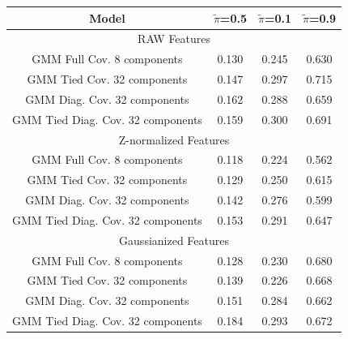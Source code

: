 \documentclass[12pt,a4paper]{article}
\begin{document}
\begin{center}
    \renewcommand{\arraystretch}{1.2}
    \begin{tabular}{@{}cccc@{}}
        Model                                        & \(\tilde{\pi}\)=0.5  & \(\tilde{\pi}\)=0.1   & \(\tilde{\pi}\)=0.9  \\ [0.5ex]

        \hline
        \multicolumn{4}{c}{RAW Features}                                                                                   \\
        \hline
        GMM Full Cov. 8 components                   & 0.130                & 0.245                 & 0.630                \\
        GMM Tied Cov. 32 components                  & 0.147                & 0.297                 & 0.715                \\
        GMM Diag. Cov. 32 components                 & 0.162                & 0.288                 & 0.659                \\
        GMM Tied Diag. Cov. 32 components            & 0.159                & 0.300                 & 0.691                \\

        \hline
        \multicolumn{4}{c}{Z-normalized Features}                                                                          \\
        \hline
        GMM Full Cov. 8 components                   & {\color{red} 0.118 } & {\color{red} 0.224 }  & {\color{red} 0.562 } \\
        GMM Tied Cov. 32 components                  & 0.129                & 0.250                 & 0.615                \\
        GMM Diag. Cov. 32 components                 & 0.142                & 0.276                 & 0.599                \\
        GMM Tied Diag. Cov. 32 components            & 0.153                & 0.291                 & 0.647                \\

        \hline
        \multicolumn{4}{c}{Gaussianized Features}                                                                          \\
        \hline
        GMM Full Cov. 8 components                   & 0.128                & 0.230                 & 0.680                \\
        GMM Tied Cov. 32 components                  & 0.139                & {\color{blue} 0.226 } & 0.668                \\
        GMM Diag. Cov. 32 components                 & 0.151                & 0.284                 & 0.662                \\
        GMM Tied Diag. Cov. 32 components            & 0.184                & 0.293                 & 0.672                \\


\end{tabular}
\end{center}
\end{document}
